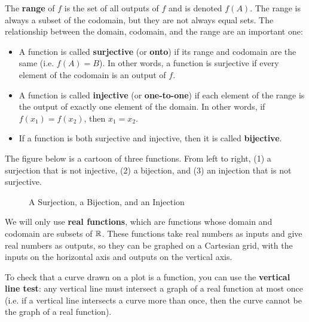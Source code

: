 The \textbf{range} of $f$ is the set of all outputs of $f$ and is denoted $f(A)$. The range is always a subset of the codomain, but they are not always equal sets. The relationship between the domain, codomain, and the range are an important one:
\begin{itemize}
\item A function is called \textbf{surjective} (or \textbf{onto}) if its range and codomain are the same (i.e. $f(A)=B$). In other words, a function is surjective if every element of the codomain is an output of $f$. 
\item A function is called \textbf{injective} (or \textbf{one-to-one}) if each element of the range is the output of exactly one element of the domain. In other words, if $f(x_1)=f(x_2)$, then $x_1=x_2$.
\item If a function is both surjective and injective, then it is called \textbf{bijective}.
\end{itemize}

The figure below is a cartoon of three functions. From left to right, (1) a surjection that is not injective, (2) a bijection, and (3) an injection that is not surjective. 



\begin{figure}[H]
\label{three-functions}
\centering
{}
\caption{A Surjection, a Bijection, and an Injection}
\end{figure}


We will only use \textbf{real functions}, which are functions whose domain and codomain are subsets of $\mathbb{R}$. These functions take real numbers as inputs and give real numbers as outputs, so they can be graphed on a Cartesian grid, with the inputs on the horizontal axis and outputs on the vertical axis.

To check that a curve drawn on a plot is a function, you can use the \textbf{vertical line test}:  any vertical line must intersect a graph of a real function at most once (i.e. if a vertical line intersects a curve more than once, then the curve cannot be the graph of a real function).


